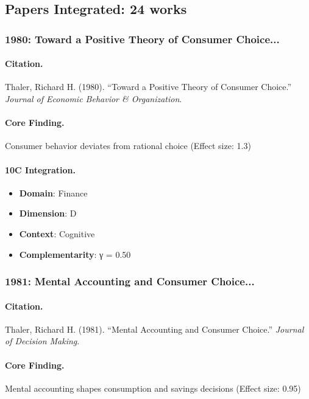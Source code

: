 \subsection{Papers Integrated: 24 works}

\subsubsection{1980: Toward a Positive Theory of Consumer Choice...}

\paragraph{Citation.}
Thaler, Richard H. (1980). ``Toward a Positive Theory of Consumer Choice.''
\textit{Journal of Economic Behavior & Organization}.

\paragraph{Core Finding.}
Consumer behavior deviates from rational choice (Effect size: 1.3)

\paragraph{10C Integration.}
\begin{itemize}[nosep]
  \item \textbf{Domain}: Finance
  \item \textbf{Dimension}: D
  \item \textbf{Context}: Cognitive
  \item \textbf{Complementarity}: γ = 0.50
\end{itemize}

\subsubsection{1981: Mental Accounting and Consumer Choice...}

\paragraph{Citation.}
Thaler, Richard H. (1981). ``Mental Accounting and Consumer Choice.''
\textit{Journal of Decision Making}.

\paragraph{Core Finding.}
Mental accounting shapes consumption and savings decisions (Effect size: 0.95)

